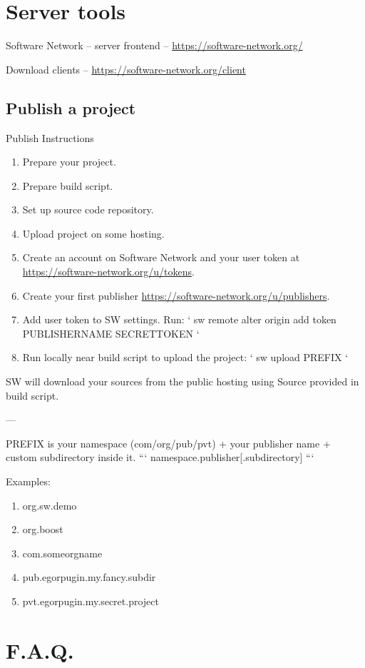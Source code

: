 

\chapter{Server tools}

Software Network -- server frontend --
\url{https://software-network.org/}

Download clients -- \url{https://software-network.org/client}

\section{Publish a project}

Publish Instructions

\begin{enumerate}

\item
Prepare your project.

\item
Prepare build script.

\item
Set up source code repository.

\item
Upload project on some hosting.

\item

Create an account on Software Network and your user token at\\ \url{https://software-network.org/u/tokens}.

\item
Create your first publisher \url{https://software-network.org/u/publishers}.

\item
Add user token to SW settings. Run:
`
sw remote alter origin add token PUBLISHERNAME SECRETTOKEN
`

\item
Run locally near build script to upload the project:
`
sw upload PREFIX
`

\end{enumerate}


SW will download your sources from the public hosting using Source provided in build script.

---

PREFIX is your namespace (com/org/pub/pvt) + your publisher name + custom subdirectory inside it.
```
namespace.publisher[.subdirectory]
```

Examples:
\begin{enumerate}
\item
org.sw.demo
\item
org.boost
\item
com.someorgname
\item
pub.egorpugin.my.fancy.subdir
\item
pvt.egorpugin.my.secret.project
\end{enumerate}













\chapter*{F.A.Q.}


